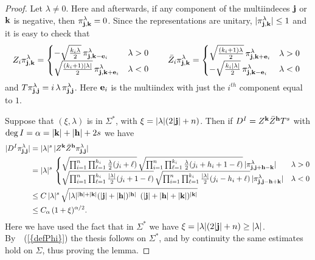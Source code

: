 \documentclass[12pt,a4paper]{amsart}
\theoremstyle{plain}
\theoremstyle{definition}
\numberwithin{equation}{section}
\begin{document}
\begin{proof} Let ${\lambda}\neq 0$.
Here and afterwards, if any component of the multiindeces ${\bf j}$ or ${\bf k}$
is negative, then $\pi^\lambda_{\bf j,\bf k}=0$.
Since the representations are unitary, $|\pi^\lambda_{\bf j,\bf k}|\leq 1$ and
it is easy to check that
$$
Z_i \pi^\lambda_{\bf j,\bf k}=
\begin{cases}
-\sqrt{\frac{k_i{\lambda}}{2}}\, \pi^{\lambda}_{{\bf j},{\bf k}-{\bf e}_i}
&{\lambda}>0
\\
\sqrt{\frac{(k_i+1)|{\lambda}|}{ 2}}\, \pi^{\lambda}_{{\bf j},{\bf k}+{\bf e}_i}
&{\lambda}<0
\end{cases}
\qquad
\bar Z_i \pi^{\lambda}_{{\bf j},{\bf k}}=
\begin{cases}\sqrt{\frac{(k_i+1){\lambda}}{2}}\, \pi^{\lambda}_{{\bf j},{\bf k}+{\bf e}_i}
&{\lambda}>0
\\
-\sqrt{\frac{k_i|{\lambda}|}{ 2}}\,\pi^{\lambda}_{{\bf j},{\bf k}-{\bf e}_i}
&{\lambda}<0\ 
\end{cases}
$$
and $T\pi^{\lambda}_{{\bf j},{\bf j}}=i\,{\lambda}\, \pi^{\lambda}_{{\bf j},{\bf j}}$.
Here ${\bf e}_i$ is the multiindex with just the $i^{th}$ component equal to $1$.

Suppose that $(\xi,{\lambda})$ is in ${{\Sigma^*}}$, with $\xi=|{\lambda}|(2|{\bf j}| +{n})$.
Then if ${{D}}^I =Z^{\bf k}\bar Z^{\bf h} T^s$ with 
$\deg I={\alpha} =|{\bf k}|+|{\bf h}|+2s$ we have 
\begin{align*}
|
{{D}}^I\pi^{\lambda}_{{\bf j},{\bf j}}
|
&
=|{\lambda}|^s\,
|Z^{\bf k}\bar Z^{\bf h}\pi^{\lambda}_{{\bf j},{\bf j}} |
\\
&=|{\lambda}|^s\,
\begin{cases}
\sqrt{\prod_{i=1}^n\prod_{\ell=1}^{h_i}\tfrac{\lambda}{2}(j_i+\ell)}\, 
\sqrt{\prod_{i=1}^n\prod_{\ell=1}^{k_i}\tfrac{\lambda}{2}(j_i+h_i+1-\ell)}\,
|\pi^{\lambda}_{{\bf j},{\bf j+h-k}}|
&{\lambda}>0
\\
\sqrt{\prod_{i=1}^n\prod_{\ell=1}^{h_i}\tfrac{|{\lambda}|}{2}(j_i+1-\ell)}\,
\sqrt{\prod_{i=1}^n\prod_{\ell=1}^{k_i}\tfrac{|{\lambda}|}{2}(j_i-h_i+\ell)}\,
|\pi^{\lambda}_{{\bf j},{\bf j-h+k}}|
&{\lambda}<0
\end{cases}
\\
&\leq C\,
|{\lambda}|^s\,\sqrt{
 |{\lambda}|^{|{\bf h}|+|{\bf k}|}(|{\bf j}|+|{\bf h}|)^{|{\bf h}|}
\,\,\,
(|{\bf j}|+|{\bf h}|+|{\bf k}|)^{|{\bf k}|}}
\\
&\leq C_{\alpha}\, (1+\xi)^{{\alpha}/2}.
\end{align*}
Here we have used the fact that in ${{\Sigma^*}}$ we have $\xi=|{\lambda}|(2|{\bf j}|+{n})\geq |{\lambda}|$.
By~{~(\ref{{defPhi}})} the thesis follows on ${{\Sigma^*}}$, and 
by continuity the same estimates hold on ${\Sigma}$, thus proving the lemma. 
\end{proof}
\end{document}
